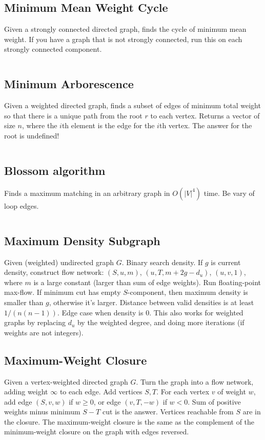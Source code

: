 \documentclass[8pt,a4paper,landscape,oneside]{amsart}
\newcommand{\code}[1]{\inputminted[fontsize=\normalsize,baselinestretch=1]{cpp}{_code/#1}}
\begin{document}
\begin{multicols*}{3}
    \subsection{Minimum Mean Weight Cycle}
        Given a strongly connected directed graph, finds the cycle of minimum
        mean weight. If you have a graph that is not strongly connected, run
        this on each strongly connected component.
        \code{graph/min_mean_cycle.cpp}

    \subsection{Minimum Arborescence}
        Given a weighted directed graph, finds a subset of edges of minimum
        total weight so that there is a unique path from the root $r$ to each
        vertex. Returns a vector of size $n$, where the $i$th element is the
        edge for the $i$th vertex. The answer for the root is undefined!
        \code{graph/arborescence.cpp}

    \subsection{Blossom algorithm}
        Finds a maximum matching in an arbitrary graph in $O(|V|^4)$ time. Be
        vary of loop edges.
        \code{graph/blossom.cpp}

    \subsection{Maximum Density Subgraph}
        Given (weighted) undirected graph $G$. Binary search density. If $g$ is
        current density, construct flow network: $(S, u, m)$, $(u, T,
        m+2g-d_u)$, $(u,v,1)$, where $m$ is a large constant (larger than sum
        of edge weights). Run floating-point max-flow. If minimum cut has empty
        $S$-component, then maximum density is smaller than $g$, otherwise it's
        larger. Distance between valid densities is at least $1/(n(n-1))$. Edge
        case when density is $0$. This also works for weighted graphs by
        replacing $d_u$ by the weighted degree, and doing more iterations (if
        weights are not integers).

    \subsection{Maximum-Weight Closure}
        Given a vertex-weighted directed graph $G$. Turn the graph into a flow
        network, adding weight $\infty$ to each edge. Add vertices $S,T$. For
        each vertex $v$ of weight $w$, add edge $(S,v,w)$ if $w\geq 0$, or edge
        $(v,T,-w)$ if $w<0$. Sum of positive weights minus minimum $S-T$ cut is
        the answer. Vertices reachable from $S$ are in the closure. The
        maximum-weight closure is the same as the complement of the
        minimum-weight closure on the graph with edges reversed.


\end{multicols*}
\end{document}
